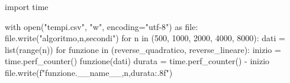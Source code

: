 \begin{unipdcode}[language=Python]
import time

with open("tempi.csv", "w", encoding="utf-8") as file:
    file.write("algoritmo,n,secondi\n")
    for n in (500, 1000, 2000, 4000, 8000):
        dati = list(range(n))
        for funzione in (reverse_quadratico, reverse_lineare):
            inizio = time.perf_counter()
            funzione(dati)
            durata = time.perf_counter() - inizio
            file.write(f"{funzione.__name__},{n},{durata:.8f}\n")
\end{unipdcode}
